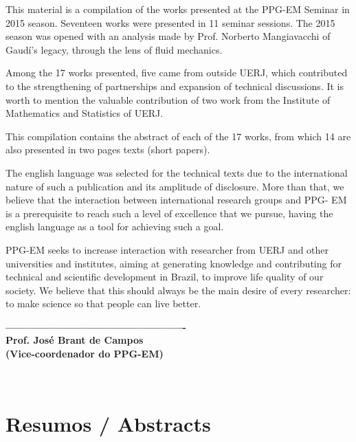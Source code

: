 \documentclass[11pt,a4paper]{book} %
\newcommand{\numpapersen}{14 }
\begin{document}
\begin{minipage}[t]{.55\textwidth}
	This material is a compilation of the works presented at the PPG-EM Seminar in 2015 season. Seventeen works were presented in 11 seminar sessions. The 2015 season was opened with an analysis made by Prof. Norberto Mangiavacchi of Gaudí’s legacy, through the lens of fluid mechanics.
	
	Among the 17 works presented, five came from outside UERJ, which contributed to the strengthening of partnerships and expansion of technical discussions. It is worth to mention the valuable contribution of two work from the Institute of Mathematics and Statistics of UERJ.
	
	This compilation contains the abstract of each of the 17 works, from which \numpapersen are also presented in two pages texts (short papers).
	
	The english language was selected for the technical texts due to the international nature of such a publication and its amplitude of disclosure. More than that, we believe that the interaction between international research groups and PPG- EM is a prerequisite to reach such a level of excellence that we pursue, having the english language as a tool for achieving such a goal. 
	
	PPG-EM seeks to increase interaction with researcher from UERJ and other universities and institutes, aiming at generating knowledge and contributing for technical and scientific development in Brazil, to improve life quality of our society. We believe that this should always be the main desire of every researcher: to make science so that people can live better.\\
	
\vspace*{19.5mm}
\begin{center}
	\textbf{-------------------------------------------------\\
		Prof. José Brant de Campos\\
		(Vice-coordenador do PPG-EM)}
\end{center}
\end{minipage}\\


\chapter{Resumos / Abstracts}
\end{document}
